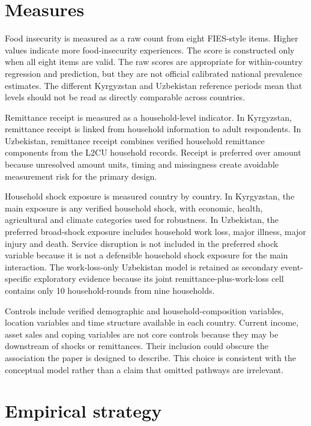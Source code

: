 \documentclass[11pt]{article}
\begin{document}
\section{Measures}

Food insecurity is measured as a raw count from eight FIES-style items. Higher values indicate more food-insecurity experiences. The score is constructed only when all eight items are valid. The raw scores are appropriate for within-country regression and prediction, but they are not official calibrated national prevalence estimates. The different Kyrgyzstan and Uzbekistan reference periods mean that levels should not be read as directly comparable across countries.

Remittance receipt is measured as a household-level indicator. In Kyrgyzstan, remittance receipt is linked from household information to adult respondents. In Uzbekistan, remittance receipt combines verified household remittance components from the L2CU household records. Receipt is preferred over amount because unresolved amount units, timing and missingness create avoidable measurement risk for the primary design.

Household shock exposure is measured country by country. In Kyrgyzstan, the main exposure is any verified household shock, with economic, health, agricultural and climate categories used for robustness. In Uzbekistan, the preferred broad-shock exposure includes household work loss, major illness, major injury and death. Service disruption is not included in the preferred shock variable because it is not a defensible household shock exposure for the main interaction. The work-loss-only Uzbekistan model is retained as secondary event-specific exploratory evidence because its joint remittance-plus-work-loss cell contains only 10 household-rounds from nine households.

Controls include verified demographic and household-composition variables, location variables and time structure available in each country. Current income, asset sales and coping variables are not core controls because they may be downstream of shocks or remittances. Their inclusion could obscure the association the paper is designed to describe. This choice is consistent with the conceptual model rather than a claim that omitted pathways are irrelevant.

\section{Empirical strategy}
\end{document}
